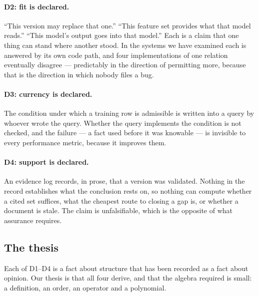 \documentclass[11pt,a4paper]{article}
\renewcommand{\_}{\oldunderscore\allowbreak}
\theoremstyle{plain}
\theoremstyle{definition}
\theoremstyle{definition}
\theoremstyle{remark}
\begin{document}
\paragraph{D2: fit is declared.} ``This version may replace that one.'' ``This feature set provides what
that model reads.'' ``This model's output goes into that model.'' Each is a claim that one thing can
stand where another stood. In the systems we have examined each is answered by its own code path, and
four implementations of one relation eventually disagree --- predictably in the direction of permitting
more, because that is the direction in which nobody files a bug.

\paragraph{D3: currency is declared.} The condition under which a training row is admissible is written
into a query by whoever wrote the query. Whether the query implements the condition is not checked,
and the failure --- a fact used before it was knowable --- is invisible to every performance metric,
because it improves them.

\paragraph{D4: support is declared.} An evidence log records, in prose, that a version was validated.
Nothing in the record establishes what the conclusion rests on, so nothing can compute whether a cited
set suffices, what the cheapest route to closing a gap is, or whether a document is stale. The claim is
unfalsifiable, which is the opposite of what assurance requires.

\subsection{The thesis}

Each of D1--D4 is a fact about structure that has been recorded as a fact about opinion. Our thesis is
that all four derive, and that the algebra required is small: a definition, an order, an operator and a
polynomial.
\end{document}
